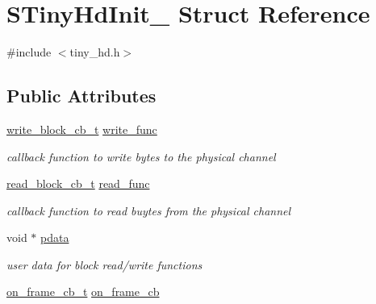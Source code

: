 \hypertarget{structSTinyHdInit__}{}\section{S\+Tiny\+Hd\+Init\+\_\+ Struct Reference}
\label{structSTinyHdInit__}


{\ttfamily \#include $<$tiny\+\_\+hd.\+h$>$}

\subsection*{Public Attributes}
\begin{DoxyCompactItemize}
\item 
\hypertarget{structSTinyHdInit___a0bd05a4fc43236ff37d67aec4d2a0952}{}\hyperlink{tiny__layer2_8h_a7f69e669de5baa69a43ee5cb439a7496}{write\+\_\+block\+\_\+cb\+\_\+t} \hyperlink{structSTinyHdInit___a0bd05a4fc43236ff37d67aec4d2a0952}{write\+\_\+func}\label{structSTinyHdInit___a0bd05a4fc43236ff37d67aec4d2a0952}

\begin{DoxyCompactList}\small\item\em callback function to write bytes to the physical channel \end{DoxyCompactList}\item 
\hypertarget{structSTinyHdInit___a5de352b11ca7915737bc459cde7c566d}{}\hyperlink{tiny__layer2_8h_ae3d867e030f59de94508902f2b84a7ec}{read\+\_\+block\+\_\+cb\+\_\+t} \hyperlink{structSTinyHdInit___a5de352b11ca7915737bc459cde7c566d}{read\+\_\+func}\label{structSTinyHdInit___a5de352b11ca7915737bc459cde7c566d}

\begin{DoxyCompactList}\small\item\em callback function to read buytes from the physical channel \end{DoxyCompactList}\item 
\hypertarget{structSTinyHdInit___a7b6be4e09ea04eaa4372eadce4d51055}{}void $\ast$ \hyperlink{structSTinyHdInit___a7b6be4e09ea04eaa4372eadce4d51055}{pdata}\label{structSTinyHdInit___a7b6be4e09ea04eaa4372eadce4d51055}

\begin{DoxyCompactList}\small\item\em user data for block read/write functions \end{DoxyCompactList}\item 
\hypertarget{structSTinyHdInit___ae2eea5181620dfbb47b60a5073bd5ed2}{}\hyperlink{tiny__layer2_8h_ad6bf709565b8aecb9e6ecf196f219d54}{on\+\_\+frame\+\_\+cb\+\_\+t} \hyperlink{structSTinyHdInit___ae2eea5181620dfbb47b60a5073bd5ed2}{on\+\_\+frame\+\_\+cb}\label{structSTinyHdInit___ae2eea5181620dfbb47b60a5073bd5ed2}


\end{DoxyCompactItemize}
